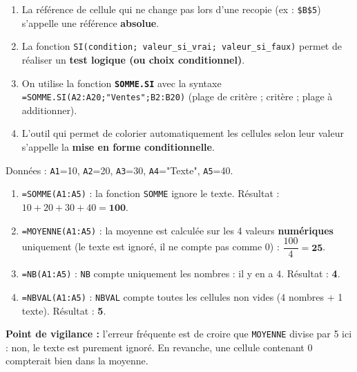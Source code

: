 \documentclass[11pt]{article}
\newcounter{popsec}
\newcounter{popsub}
\newcommand{\courssub}[1]{%
  \stepcounter{popsub}%
  \par\vspace{9pt}\noindent{\popxbold\fontsize{11.5}{13}\selectfont\color{popink}{\color{poporange}\thepopsec.\thepopsub}\hspace{6pt}#1}\par\nopagebreak\vspace{4pt}
}
\begin{document}
\begin{corrige}
\begin{enumerate}
    \item La référence de cellule qui ne change pas lors d'une recopie (ex : \texttt{\$B\$5}) s'appelle une référence \textbf{absolue}.
    \item La fonction \texttt{SI(condition; valeur\_si\_vrai; valeur\_si\_faux)} permet de réaliser un \textbf{test logique (ou choix conditionnel)}.
    \item On utilise la fonction \textbf{\texttt{SOMME.SI}} avec la syntaxe \texttt{=SOMME.SI(A2:A20;"Ventes";B2:B20)} (plage de critère ; critère ; plage à additionner).
    \item L'outil qui permet de colorier automatiquement les cellules selon leur valeur s'appelle la \textbf{mise en forme conditionnelle}.
\end{enumerate}
\end{corrige}

\begin{corrige}
Données : \texttt{A1}=10, \texttt{A2}=20, \texttt{A3}=30, \texttt{A4}="Texte", \texttt{A5}=40.
\begin{enumerate}
    \item \texttt{=SOMME(A1:A5)} : la fonction \texttt{SOMME} ignore le texte. Résultat : $10+20+30+40 = \mathbf{100}$.
    \item \texttt{=MOYENNE(A1:A5)} : la moyenne est calculée sur les 4 valeurs \textbf{numériques} uniquement (le texte est ignoré, il ne compte pas comme 0) : $\dfrac{100}{4} = \mathbf{25}$.
    \item \texttt{=NB(A1:A5)} : \texttt{NB} compte uniquement les nombres : il y en a 4. Résultat : \textbf{4}.
    \item \texttt{=NBVAL(A1:A5)} : \texttt{NBVAL} compte toutes les cellules non vides (4 nombres + 1 texte). Résultat : \textbf{5}.
\end{enumerate}
\textbf{Point de vigilance :} l'erreur fréquente est de croire que \texttt{MOYENNE} divise par 5 ici : non, le texte est purement ignoré. En revanche, une cellule contenant 0 compterait bien dans la moyenne.
\end{corrige}

\courssub{Je m'entraîne}
\end{document}
